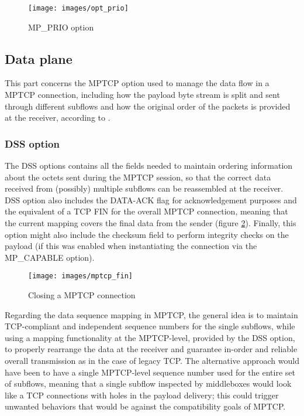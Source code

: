\begin{figure}[!htb]
\centering
\texttt{[image: images/opt\_prio]}
\caption{MP\_PRIO option}
\label{fig:opt_prio}
\end{figure}

\subsection{Data plane}
\label{dataplane}
This part concerns the MPTCP option used to manage the data flow in a MPTCP connection, including how the payload byte stream is split and sent through different subflows and how the original order of the packets is provided at the receiver, according to .

\subsubsection{DSS option}
\label{dss}
The DSS options contains all the fields needed to maintain ordering information about the octets sent during the MPTCP session, so that the correct data received from (possibly) multiple subflows can be reassembled at the receiver. DSS option also includes the DATA-ACK flag for acknowledgement purposes and the equivalent of a TCP FIN for the overall MPTCP connection, meaning that the current mapping covers the final data from the sender (figure \ref{fig:mptcp_fin}). Finally, this option might also include the checksum field to perform integrity checks on the payload (if this was enabled when instantiating the connection via the MP\_CAPABLE option).

\begin{figure}[!htb]
\centering
\texttt{[image: images/mptcp\_fin]}
\caption{Closing a MPTCP connection}
\label{fig:mptcp_fin}
\end{figure}

Regarding the data sequence mapping in MPTCP, the general idea is to maintain TCP-compliant and independent sequence numbers for the single subflows, while using a mapping functionality at the MPTCP-level, provided by the DSS option, to properly rearrange the data at the receiver and guarantee in-order and reliable overall transmission as in the case of legacy TCP. The alternative approach would have been to have a single MPTCP-level sequence number used for the entire set of subflows, meaning that a single subflow inspected by middleboxes would look like a TCP connections with holes in the payload delivery; this could trigger unwanted behaviors that would be against the compatibility goals of MPTCP.


